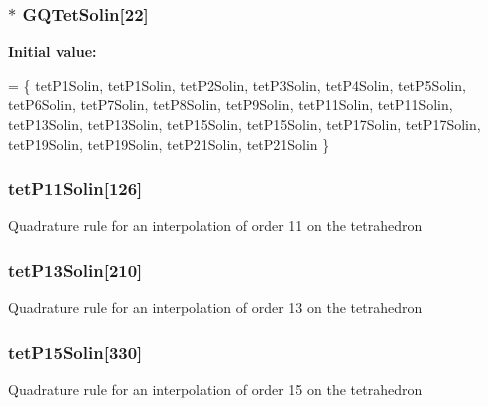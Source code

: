 \subsubsection[{G\-Q\-Tet\-Solin}]{$\ast$ G\-Q\-Tet\-Solin[22]}\label{GaussQuadratureTet_8cc_a8d66272803749c0d498308654dd89c8e}
{\bfseries Initial value\-:}
\begin{DoxyCode}
= \{
  tetP1Solin,
  tetP1Solin,
  tetP2Solin,
  tetP3Solin,
  tetP4Solin,
  tetP5Solin,
  tetP6Solin,
  tetP7Solin,
  tetP8Solin,
  tetP9Solin,
  tetP11Solin,
  tetP11Solin,
  tetP13Solin,
  tetP13Solin,
  tetP15Solin,
  tetP15Solin,
  tetP17Solin,
  tetP17Solin,
  tetP19Solin,
  tetP19Solin,
  tetP21Solin,
  tetP21Solin
\}
\end{DoxyCode}
\subsubsection[{tet\-P11\-Solin}]{ tet\-P11\-Solin[126]}\label{GaussQuadratureTet_8cc_a51d2e5260d0ef1e432a192ac4245a7c6}
Quadrature rule for an interpolation of order 11 on the tetrahedron 
\subsubsection[{tet\-P13\-Solin}]{ tet\-P13\-Solin[210]}\label{GaussQuadratureTet_8cc_a64aed983c0af94e680e171964384ef55}
Quadrature rule for an interpolation of order 13 on the tetrahedron 
\subsubsection[{tet\-P15\-Solin}]{ tet\-P15\-Solin[330]}\label{GaussQuadratureTet_8cc_acca5d3da2f4ddb234443df33acecb17a}
Quadrature rule for an interpolation of order 15 on the tetrahedron 
